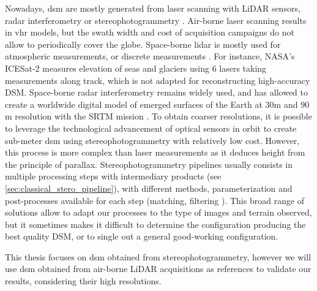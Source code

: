 Nowadays, \acrshort{dsm} are mostly generated from laser scanning with LiDAR sensors, radar interferometry or stereophotogrammetry \cite{youssefi_cars_2020}. Air-borne laser scanning results in \acrfull{vhr} models, but the swath width and cost of acquisition campaigns do not allow to periodically cover the globe. Space-borne \acrshort{lidar} is mostly used for atmospheric measurements, or discrete measurements \cite{fouladinejad_history_2019}. For instance, NASA's ICESat-2 \cite{jasinski_atlasicesat-2_2020} measures elevation of seas and glaciers using 6 lasers taking measurements along track, which is not adapted for reconstructing high-accuracy DSM. Space-borne radar interferometry remains widely used, and has allowed to create a worldwide digital model of emerged surfaces of the Earth at $30$m and $90$m resolution with the SRTM mission \cite{farr_shuttle_2007}. To obtain coarser resolutions, it is possible to leverage the technological advancement of optical sensors in orbit to create sub-meter \acrshort{dsm} using stereophotogrammetry with relatively low cost. However, this process is more complex than laser measurements as it deduces height from the principle of parallax. Stereophotogrammetry pipelines usually consists in multiple processing steps with intermediary products (see \ref{sec:classical_stero_pipeline}), with different methods, parameterization and post-processes available for each step (\eg matching, filtering \etc). This broad range of solutions allow to adapt our processes to the type of images and terrain observed, but it sometimes makes it difficult to determine the configuration producing the best quality DSM, or to single out a general good-working configuration. 

This thesis focuses on \acrshort{dsm} obtained from stereophotogrammetry, however we will use \acrshort{dsm} obtained from air-borne LiDAR acquisitions as references to validate our results, considering their high resolutions.

